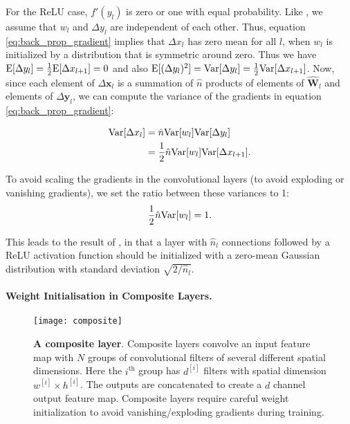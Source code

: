 \documentclass[thesis]{subfiles}
\begin{document}
    For the ReLU case, $f'(y_l)$ is zero or one with equal probability. 
    Like \citet{glorot2010understanding}, we assume that $w_l$ and $\Delta y_l$ are independent of each other. Thus, equation \ref{eq:back_prop_gradient} implies that $\Delta x_l$ has zero mean for all $l$, when $w_l$ is initialized by a distribution that is symmetric around zero. Thus we have $\mathrm{E}[\Delta y_l] = \frac{1}{2}\mathrm{E}[\Delta x_{l+1}]= 0$ and also $\mathrm{E}[(\Delta y_l)^2] = \mathrm{Var}[\Delta y_l] = \frac{1}{2} \mathrm{Var}[\Delta x_{l+1}]$. Now, since each element of $\Delta \mathbf{x}_l$ is a summation of $\hat n$ products of elements of $\hat{\mathbf{W}}_l$ and elements of $\Delta \mathbf{y}_l$, we can compute the variance of the gradients in equation \ref{eq:back_prop_gradient}:
    
    \begin{equation}
    \begin{aligned}
    \mathrm{Var}[\Delta x_l] &=  \hat{n} \mathrm{Var}[w_l] \mathrm{Var}[\Delta y_l]\\
    &= \frac{1}{2}   \hat{n} \mathrm{Var}[w_l] \mathrm{Var} [\Delta x_{l+1}].
    \end{aligned}
    \end{equation}
    
    
    To avoid scaling the gradients in the convolutional layers (to avoid exploding or vanishing gradients), we set the ratio between these variances to 1:
    \begin{equation}
    \frac{1}{2} \hat{n} \mathrm{Var}[w_l] = 1.
    \end{equation}
    
    This leads to the result of \citet{He2015delving}, in that a layer with $\hat{n}_l$ connections followed by a ReLU activation function should be initialized with a zero-mean Gaussian distribution with standard deviation $\sqrt{2/ \hat{n}_l}$.
    
    \paragraph{Weight Initialisation in Composite Layers.}
    \begin{figure}[tbp]
        \centering
        \texttt{[image: composite]}
        \caption[Composite Layer.]{{\bf A composite layer}. Composite layers convolve an input feature map with $N$ groups of convolutional filters of several different spatial dimensions. Here the $i^\text{th}$ group has $d^{[i]}$ filters with spatial dimension $w^{[i]} \times h^{[i]}$. The outputs are concatenated to create a $d$ channel output feature map. Composite layers require careful weight initialization to avoid vanishing/exploding gradients during training.}
        \label{fig:compositelayers}
    \end{figure}
    
\end{document}

